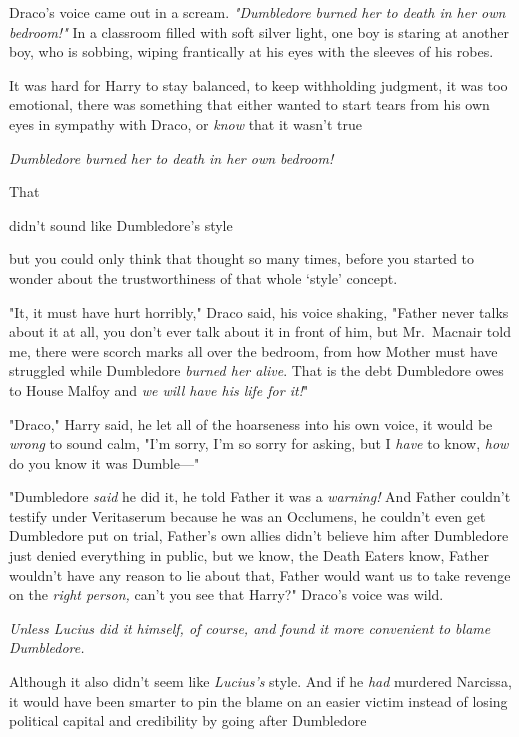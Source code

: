 Draco's voice came out in a scream. \emph{"Dumbledore burned her to death in
her own bedroom!"}
\sbreak
In a classroom filled with soft silver light, one boy is staring at another
boy, who is sobbing, wiping frantically at his eyes with the sleeves of his
robes.

It was hard for Harry to stay balanced, to keep withholding judgment, it was
too emotional, there was something that either wanted to start tears from his
own eyes in sympathy with Draco, or \emph{know} that it wasn't true{\el}

\emph{Dumbledore burned her to death in her own bedroom!}

That{\el}

{\el} didn't sound like Dumbledore's style{\el}

{\el} but you could only think that thought so many times, before you started
to wonder about the trustworthiness of that whole `style' concept.

"It, it must have hurt horribly," Draco said, his voice shaking, "Father never
talks about it at all, you don't ever talk about it in front of him, but
Mr.~Macnair told me, there were scorch marks all over the bedroom, from how
Mother must have struggled while Dumbledore \emph{burned her alive}. That is
the debt Dumbledore owes to House Malfoy and \emph{we will have his life for
it!}"

"Draco," Harry said, he let all of the hoarseness into his own voice, it would
be \emph{wrong} to sound calm, "I'm sorry, I'm so sorry for asking, but I
\emph{have} to know, \emph{how} do you know it was Dumble\mbox{---}"

"Dumbledore \emph{said} he did it, he told Father it was a \emph{warning!} And
Father couldn't testify under Veritaserum because he was an Occlumens, he
couldn't even get Dumbledore put on trial, Father's own allies didn't believe
him after Dumbledore just denied everything in public, but we know, the Death
Eaters know, Father wouldn't have any reason to lie about that, Father would
want us to take revenge on the \emph{right person,} can't you see that Harry?"
Draco's voice was wild.

\emph{Unless Lucius did it himself, of course, and found it more convenient to
blame Dumbledore.}

Although{\el} it also didn't seem like \emph{Lucius's} style. And if he
\emph{had} murdered Narcissa, it would have been smarter to pin the blame on an
easier victim instead of losing political capital and credibility by going
after Dumbledore{\el}

